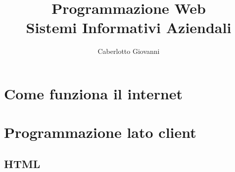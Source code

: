 \documentclass{report}
\title{\Huge{Programmazione Web}\\Sistemi Informativi Aziendali}
\author{\huge{Caberlotto Giovanni}}
\date{}
\begin{document}
\maketitle
\newpage%
\tableofcontents
\pagebreak

\chapter{Come funziona il internet} %
\label{chap:Come funziona il internet}


\chapter{Programmazione lato client} %
\label{chap:Programmazione lato client}

\section{HTML}
\end{document}
